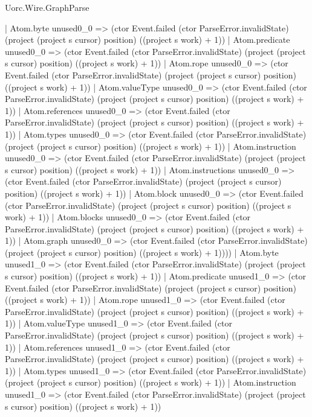 \begin{lexlean}{Uorc.Wire.GraphParse}
\begin{semanticmodule}
{              | Atom.byte unused0_0 => (ctor Event.failed (ctor ParseError.invalidState) (project (project s cursor) position) ((project s work) + 1))
              | Atom.predicate unused0_0 => (ctor Event.failed (ctor ParseError.invalidState) (project (project s cursor) position) ((project s work) + 1))
              | Atom.rope unused0_0 => (ctor Event.failed (ctor ParseError.invalidState) (project (project s cursor) position) ((project s work) + 1))
              | Atom.valueType unused0_0 => (ctor Event.failed (ctor ParseError.invalidState) (project (project s cursor) position) ((project s work) + 1))
              | Atom.references unused0_0 => (ctor Event.failed (ctor ParseError.invalidState) (project (project s cursor) position) ((project s work) + 1))
              | Atom.types unused0_0 => (ctor Event.failed (ctor ParseError.invalidState) (project (project s cursor) position) ((project s work) + 1))
              | Atom.instruction unused0_0 => (ctor Event.failed (ctor ParseError.invalidState) (project (project s cursor) position) ((project s work) + 1))
              | Atom.instructions unused0_0 => (ctor Event.failed (ctor ParseError.invalidState) (project (project s cursor) position) ((project s work) + 1))
              | Atom.block unused0_0 => (ctor Event.failed (ctor ParseError.invalidState) (project (project s cursor) position) ((project s work) + 1))
              | Atom.blocks unused0_0 => (ctor Event.failed (ctor ParseError.invalidState) (project (project s cursor) position) ((project s work) + 1))
              | Atom.graph unused0_0 => (ctor Event.failed (ctor ParseError.invalidState) (project (project s cursor) position) ((project s work) + 1))))
          | Atom.byte unused1_0 => (ctor Event.failed (ctor ParseError.invalidState) (project (project s cursor) position) ((project s work) + 1))
          | Atom.predicate unused1_0 => (ctor Event.failed (ctor ParseError.invalidState) (project (project s cursor) position) ((project s work) + 1))
          | Atom.rope unused1_0 => (ctor Event.failed (ctor ParseError.invalidState) (project (project s cursor) position) ((project s work) + 1))
          | Atom.valueType unused1_0 => (ctor Event.failed (ctor ParseError.invalidState) (project (project s cursor) position) ((project s work) + 1))
          | Atom.references unused1_0 => (ctor Event.failed (ctor ParseError.invalidState) (project (project s cursor) position) ((project s work) + 1))
          | Atom.types unused1_0 => (ctor Event.failed (ctor ParseError.invalidState) (project (project s cursor) position) ((project s work) + 1))
          | Atom.instruction unused1_0 => (ctor Event.failed (ctor ParseError.invalidState) (project (project s cursor) position) ((project s work) + 1))
}
\end{semanticmodule}
\end{lexlean}
